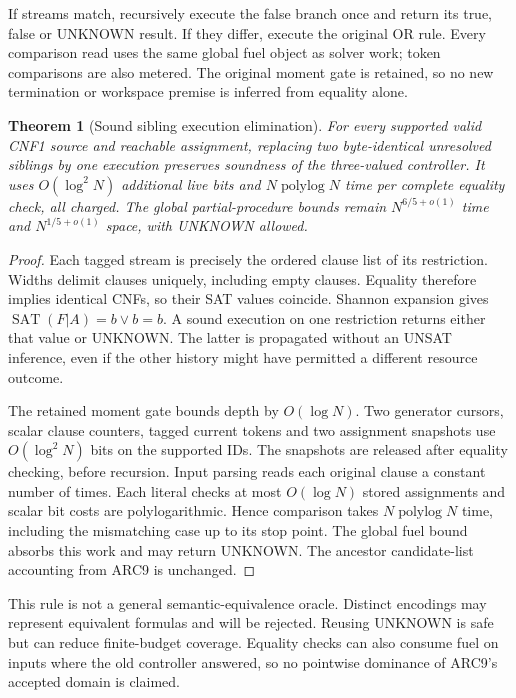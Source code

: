 \documentclass[11pt]{article}
\newtheorem{theorem}{Theorem}
\begin{document}
If streams match, recursively execute the false branch once and return its
true, false or UNKNOWN result. If they differ, execute the original OR rule.
Every comparison read uses the same global fuel object as solver work; token
comparisons are also metered. The original moment gate is retained, so no new
termination or workspace premise is inferred from equality alone.

\begin{theorem}[Sound sibling execution elimination]
For every supported valid CNF1 source and reachable assignment, replacing two
byte-identical unresolved siblings by one execution preserves soundness of the
three-valued controller. It uses $O(\log^2N)$ additional live bits and
$N\operatorname{polylog}N$ time per complete equality check, all charged.
The global partial-procedure bounds remain $N^{6/5+o(1)}$ time and
$N^{1/5+o(1)}$ space, with UNKNOWN allowed.
\end{theorem}
\begin{proof}
Each tagged stream is precisely the ordered clause list of its restriction.
Widths delimit clauses uniquely, including empty clauses. Equality therefore
implies identical CNFs, so their SAT values coincide. Shannon expansion gives
$\operatorname{SAT}(F|A)=b\lor b=b$. A sound execution on one restriction
returns either that value or UNKNOWN. The latter is propagated without an
UNSAT inference, even if the other history might have permitted a different
resource outcome.

The retained moment gate bounds depth by $O(\log N)$. Two generator cursors,
scalar clause counters, tagged current tokens and two assignment snapshots
use $O(\log^2N)$ bits on the supported IDs. The snapshots are released after
equality checking, before recursion. Input parsing reads each original clause
a constant number of times. Each literal checks at most $O(\log N)$ stored
assignments and scalar bit costs are polylogarithmic. Hence comparison takes
$N\operatorname{polylog}N$ time, including the mismatching case up to its
stop point. The global fuel bound absorbs this work and may return UNKNOWN.
The ancestor candidate-list accounting from ARC9 is unchanged.
\end{proof}

This rule is not a general semantic-equivalence oracle. Distinct encodings
may represent equivalent formulas and will be rejected. Reusing UNKNOWN is
safe but can reduce finite-budget coverage. Equality checks can also consume
fuel on inputs where the old controller answered, so no pointwise dominance
of ARC9's accepted domain is claimed.
\end{document}
